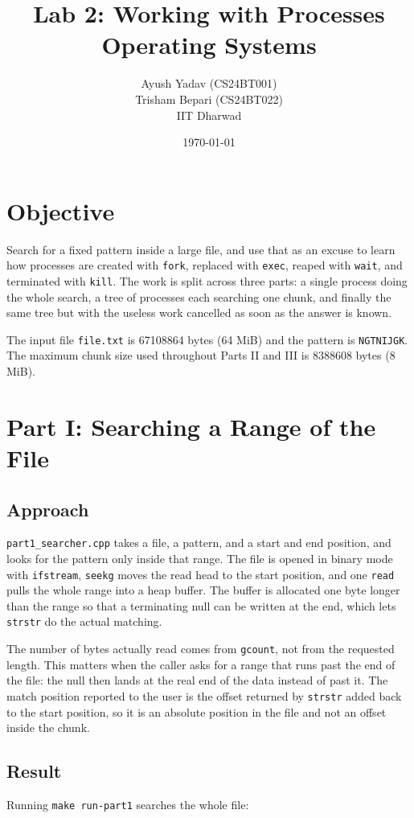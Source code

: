 \documentclass[11pt]{article}
\title{Lab 2: Working with Processes \\ \large Operating Systems}
\author{Ayush Yadav (CS24BT001) \\ Trisham Bepari (CS24BT022) \\ IIT Dharwad}
\date{\today}
\begin{document}
\maketitle

\section*{Objective}
Search for a fixed pattern inside a large file, and use that as an excuse to learn
how processes are created with \texttt{fork}, replaced with \texttt{exec}, reaped
with \texttt{wait}, and terminated with \texttt{kill}. The work is split across
three parts: a single process doing the whole search, a tree of processes each
searching one chunk, and finally the same tree but with the useless work cancelled
as soon as the answer is known.

The input file \texttt{file.txt} is 67108864 bytes (64 MiB) and the pattern is
\texttt{NGTNIJGK}. The maximum chunk size used throughout Parts II and III is
8388608 bytes (8 MiB).

\section*{Part I: Searching a Range of the File}

\subsection*{Approach}
\texttt{part1\_searcher.cpp} takes a file, a pattern, and a start and end position,
and looks for the pattern only inside that range. The file is opened in binary mode
with \texttt{ifstream}, \texttt{seekg} moves the read head to the start position,
and one \texttt{read} pulls the whole range into a heap buffer. The buffer is
allocated one byte longer than the range so that a terminating null can be written
at the end, which lets \texttt{strstr} do the actual matching.

The number of bytes actually read comes from \texttt{gcount}, not from the
requested length. This matters when the caller asks for a range that runs past the
end of the file: the null then lands at the real end of the data instead of past
it. The match position reported to the user is the offset returned by
\texttt{strstr} added back to the start position, so it is an absolute position in
the file and not an offset inside the chunk.

\subsection*{Result}
Running \texttt{make run-part1} searches the whole file:
\end{document}
